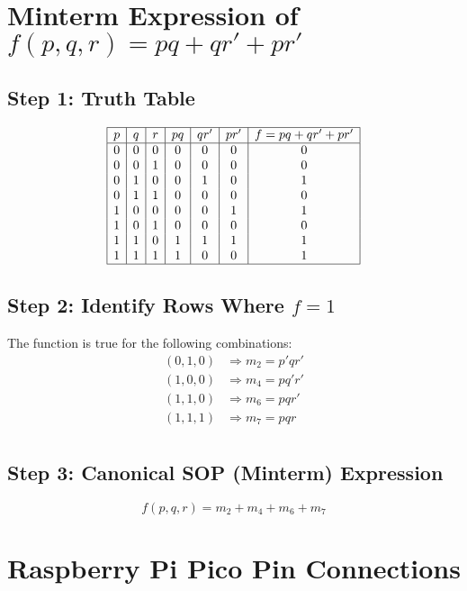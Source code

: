 \documentclass{article}
\begin{document}
\section*{Minterm Expression of \(f(p, q, r) = pq + qr' + pr'\)}

\subsection*{Step 1: Truth Table}

\[
\begin{array}{|c|c|c|c|c|c|c|}
\hline
p & q & r & pq & qr' & pr' & f = pq + qr' + pr' \\
\hline
0 & 0 & 0 & 0 & 0 & 0 & 0 \\
0 & 0 & 1 & 0 & 0 & 0 & 0 \\
0 & 1 & 0 & 0 & 1 & 0 & 1 \\
0 & 1 & 1 & 0 & 0 & 0 & 0 \\
1 & 0 & 0 & 0 & 0 & 1 & 1 \\
1 & 0 & 1 & 0 & 0 & 0 & 0 \\
1 & 1 & 0 & 1 & 1 & 1 & 1 \\
1 & 1 & 1 & 1 & 0 & 0 & 1 \\
\hline
\end{array}
\]

\subsection*{Step 2: Identify Rows Where \(f = 1\)}

The function is true for the following combinations:
\[
\begin{aligned}
(0,1,0) &\Rightarrow m_2 = p' q r' \\
(1,0,0) &\Rightarrow m_4 = p q' r' \\
(1,1,0) &\Rightarrow m_6 = p q r' \\
(1,1,1) &\Rightarrow m_7 = p q r \\
\end{aligned}
\]

\subsection*{Step 3: Canonical SOP (Minterm) Expression}

\[
\boxed{f(p, q, r) = m_2 + m_4 + m_6 + m_7}
\]



\section*{Raspberry Pi Pico Pin Connections}
\end{document}
